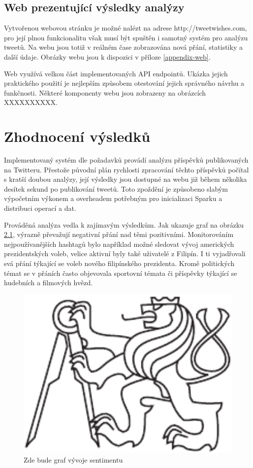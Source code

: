 \documentclass[thesis=B,czech]{FITthesis}[2012/06/26]
\begin{document}
\section{Web prezentující výsledky analýzy}
Vytvořenou webovou stránku je možné nalézt na adrese http://tweetwishes.com, pro její plnou funkcionalitu však musí být spuštěn i samotný systém pro analýzu tweetů. Na webu jsou totiž v reálném čase zobrazována nová přání, statistiky a další údaje. Obrázky webu jsou k dispozici v příloze \ref{appendix-web}. 

Web využívá velkou část implementovaných API endpointů. Ukázka jejich praktického použití je nejlepším způsobem otestování jejich správného návrhu a funkčnosti. Některé komponenty webu jsou zobrazeny na obrázcích XXXXXXXXXX. 


\chapter{Zhodnocení výsledků}
\label{zhodnoceni}
Implementovaný systém dle požadavků provádí analýzu příspěvků publikovaných na Twitteru. Přestože původní plán rychlosti zpracování těchto příspěvků počítal s kratší doubou analýzy, její výsledky jsou dostupné na webu již během několika desítek sekund po publikování tweetů. Toto zpoždění je způsobeno slabým výpočetním výkonem a overheadem potřebným pro inicializaci Sparku a distribuci operací a dat. 

Prováděná analýza vedla k zajímavým výsledkům. Jak ukazuje graf na obrázku \ref{fig:sentiment-graph}, výrazně převažují negativní přání nad těmi pozitivními. Monitorováním nejpoužívanějších hashtagů bylo například možné sledovat vývoj amerických prezidentských voleb, velice aktivní byly také uživatelé z Filipín. I ti vyjadřovali svá přání týkající se voleb nového filipínského prezidenta. Kromě politických témat se v přáních často objevovala sportovní témata či příspěvky týkající se hudebních a filmových hvězd. 
\begin{figure}[h]
   	\centering
   	\includegraphics[width=1\textwidth]{images/cvut-logo-bw.pdf}
   	\caption{Zde bude graf vývoje sentimentu}
   	\label{fig:sentiment-graph}
\end{figure}
\end{document}
